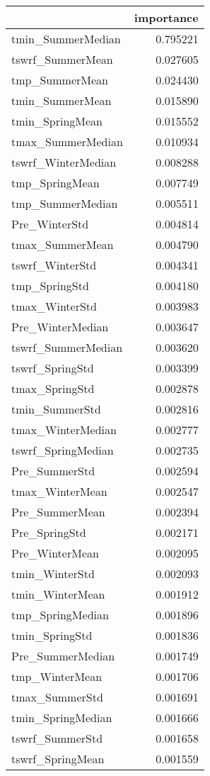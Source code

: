 \begin{tabular}{lr}
\toprule
 & importance \\
\midrule
tmin_SummerMedian & 0.795221 \\
tswrf_SummerMean & 0.027605 \\
tmp_SummerMean & 0.024430 \\
tmin_SummerMean & 0.015890 \\
tmin_SpringMean & 0.015552 \\
tmax_SummerMedian & 0.010934 \\
tswrf_WinterMedian & 0.008288 \\
tmp_SpringMean & 0.007749 \\
tmp_SummerMedian & 0.005511 \\
Pre_WinterStd & 0.004814 \\
tmax_SummerMean & 0.004790 \\
tswrf_WinterStd & 0.004341 \\
tmp_SpringStd & 0.004180 \\
tmax_WinterStd & 0.003983 \\
Pre_WinterMedian & 0.003647 \\
tswrf_SummerMedian & 0.003620 \\
tswrf_SpringStd & 0.003399 \\
tmax_SpringStd & 0.002878 \\
tmin_SummerStd & 0.002816 \\
tmax_WinterMedian & 0.002777 \\
tswrf_SpringMedian & 0.002735 \\
Pre_SummerStd & 0.002594 \\
tmax_WinterMean & 0.002547 \\
Pre_SummerMean & 0.002394 \\
Pre_SpringStd & 0.002171 \\
Pre_WinterMean & 0.002095 \\
tmin_WinterStd & 0.002093 \\
tmin_WinterMean & 0.001912 \\
tmp_SpringMedian & 0.001896 \\
tmin_SpringStd & 0.001836 \\
Pre_SummerMedian & 0.001749 \\
tmp_WinterMean & 0.001706 \\
tmax_SummerStd & 0.001691 \\
tmin_SpringMedian & 0.001666 \\
tswrf_SummerStd & 0.001658 \\
tswrf_SpringMean & 0.001559 \\

\end{tabular}

